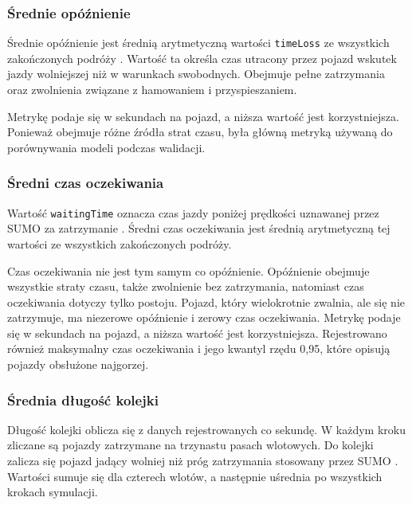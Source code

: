 \subsubsection{Średnie opóźnienie}
\label{subsubsec:metryka-opoznienie}

Średnie opóźnienie jest średnią arytmetyczną wartości \texttt{timeLoss} ze wszystkich zakończonych podróży \cite{sumo_tripinfo_docs}. Wartość ta określa czas utracony przez pojazd wskutek jazdy wolniejszej niż w warunkach swobodnych. Obejmuje pełne zatrzymania oraz zwolnienia związane z hamowaniem i przyspieszaniem.

Metrykę podaje się w sekundach na pojazd, a niższa wartość jest korzystniejsza. Ponieważ obejmuje różne źródła strat czasu, była główną metryką używaną do porównywania modeli podczas walidacji.

\subsubsection{Średni czas oczekiwania}
\label{subsubsec:metryka-oczekiwanie}

Wartość \texttt{waitingTime} oznacza czas jazdy poniżej prędkości uznawanej przez SUMO za zatrzymanie \cite{sumo_tripinfo_docs}. Średni czas oczekiwania jest średnią arytmetyczną tej wartości ze wszystkich zakończonych podróży.

Czas oczekiwania nie jest tym samym co opóźnienie. Opóźnienie obejmuje wszystkie straty czasu, także zwolnienie bez zatrzymania, natomiast czas oczekiwania dotyczy tylko postoju. Pojazd, który wielokrotnie zwalnia, ale się nie zatrzymuje, ma niezerowe opóźnienie i zerowy czas oczekiwania. Metrykę podaje się w sekundach na pojazd, a niższa wartość jest korzystniejsza. Rejestrowano również maksymalny czas oczekiwania i jego kwantyl rzędu 0,95, które opisują pojazdy obsłużone najgorzej.

\subsubsection{Średnia długość kolejki}
\label{subsubsec:metryka-kolejka}

Długość kolejki oblicza się z danych rejestrowanych co sekundę. W każdym kroku zliczane są pojazdy zatrzymane na trzynastu pasach wlotowych. Do kolejki zalicza się pojazd jadący wolniej niż próg zatrzymania stosowany przez SUMO \cite{sumo_lane_docs}. Wartości sumuje się dla czterech wlotów, a następnie uśrednia po wszystkich krokach symulacji.

